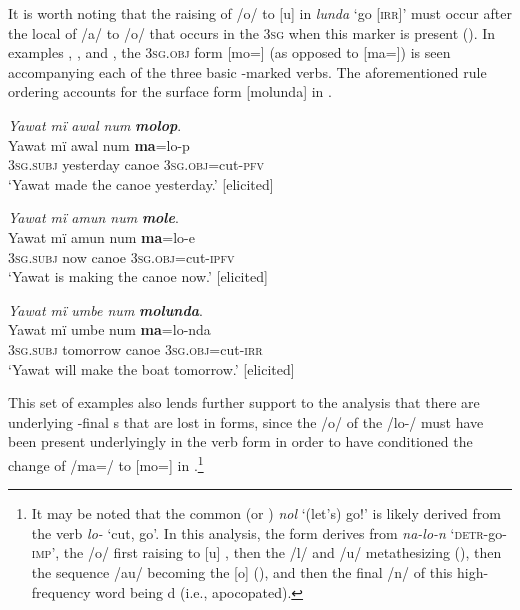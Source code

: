   It is worth noting that the raising of /o/ to [u] in \textit{lunda} ‘go [\textsc{irr}]’ must occur after the local   of /a/ to /o/ that occurs in the 3\textsc{sg}  when this marker is present (). In examples , , and , the 3\textsc{sg.obj} form [mo=] (as opposed to [ma=]) is seen accompanying each of the three basic -marked verbs. The aforementioned rule ordering accounts for the surface form [molunda] in .

\ea%
    \label{ex:verbs:7}
            \textit{Yawat mï awal num} \textbf{\textit{molop}}.\\
\gll Yawat  mï      awal    num  \textbf{ma}=lo-p\\
    [name]  3\textsc{sg.subj}  yesterday  canoe  3\textsc{sg.obj}=cut-\textsc{pfv}\\
\glt `Yawat made the canoe yesterday.’ [elicited]
\z

\ea%
    \label{ex:verbs:8}
            \textit{Yawat mï amun num} \textbf{\textit{mole}}.\\
\gll Yawat  mï      amun    num  \textbf{ma}=lo-e\\
    [name]  3\textsc{sg.subj}  now    canoe  \textsc{3sg.obj}=cut-\textsc{ipfv}\\
\glt `Yawat is making the canoe now.’ [elicited]
\z

\ea%
    \label{ex:verbs:9}
            \textit{Yawat mï umbe num} \textbf{\textit{molunda}}.\\
\gll Yawat  mï      umbe    num  \textbf{ma}=lo{}-nda\\
    [name]  3\textsc{sg.subj}  tomorrow  canoe  \textsc{3sg.obj}=cut-\textsc{irr}\\
\glt `Yawat will make the boat tomorrow.’ [elicited]
\z

This set of examples also lends further support to the analysis that there are underlying -final s that are lost in  forms, since the /o/ of the  /lo-/ must have been present underlyingly in the  verb form in order to have conditioned the change of /ma=/ to [mo=] in .\footnote{  It may be noted that the common  (or ) \textit{nol} ‘(let’s) go!’ is likely derived from the verb \textit{lo-} ‘cut, go’. In this analysis, the form derives from \textit{na-lo-n} ‘\textsc{detr}{}-go-\textsc{imp’}, the /o/ first raising to [u] , then the /l/ and /u/  metathesizing (), then the sequence /au/ becoming the   [o] (), and then the final /n/ of this high-frequency word being d (i.e.,  apocopated).}

